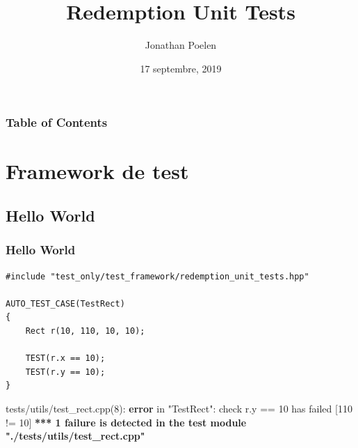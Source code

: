 \documentclass{beamer}
\title{Redemption Unit Tests}
\author{Jonathan Poelen}
\institute{Wallix}
\date{17 septembre, 2019}
\begin{document}
\frame{\titlepage}


\begin{frame}
\frametitle{Table of Contents}
\tableofcontents
\end{frame}




\section{Framework de test}

\subsection{Hello World}


\begin{frame}[fragile]
\frametitle{Hello World}

\begin{lstlisting}
#include "test_only/test_framework/redemption_unit_tests.hpp"

AUTO_TEST_CASE(TestRect)
{
    Rect r(10, 110, 10, 10);

    TEST(r.x == 10);
    TEST(r.y == 10);
}
\end{lstlisting}

{\color{f7}tests/utils/test\_rect.cpp(8)}: \textbf{\color{f1}error} in "{\color{f5}TestRect}":
 {\color{f4}check} {\color{f1}r.y} {\color{f3}==} {\color{f1}10 has} failed [{\color{f6}110} {\color{f3}!=} {\color{f6}10}] \newline \newline
\textbf{\color{f1}*** 1 failure is detected in the test module "./tests/utils/test\_rect.cpp"}

\end{frame}
\end{document}
